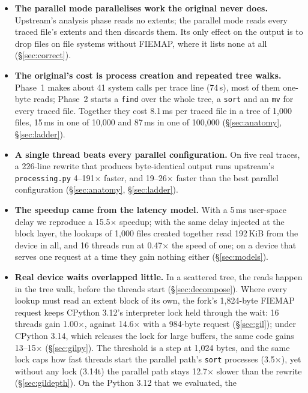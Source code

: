 \begin{itemize}
\item \textbf{The parallel mode parallelises work the original never does.} Upstream's
  analysis phase reads no extents; the parallel mode reads every traced file's
  extents and then discards them. Its only effect on the output is to drop files on
  file systems without FIEMAP, where it lists none at all (\S\ref{sec:correct}).
\item \textbf{The original's cost is process creation and repeated tree walks.}
  Phase~1 makes about 41 system calls per trace line (74\,\textmu s), most of them
  one-byte reads; Phase~2 starts a \texttt{find} over the whole tree, a \texttt{sort}
  and an \texttt{mv} for every traced file. Together they cost 8.1\,ms per traced file
  in a tree of 1{,}000 files, 15\,ms in one of 10{,}000 and 87\,ms in one of 100{,}000
  (\S\ref{sec:anatomy}, \S\ref{sec:ladder}).
\item \textbf{A single thread beats every parallel configuration.} On five real traces,
  a 226-line rewrite that produces byte-identical output runs upstream's
  \texttt{processing.py} 4--191$\times$ faster, and 19--26$\times$ faster than the best
  parallel configuration (\S\ref{sec:anatomy}, \S\ref{sec:ladder}).
\item \textbf{The speedup came from the latency model.} With a 5\,ms user-space delay
  we reproduce a 15.5$\times$ speedup; with the same delay injected at the block
  layer, the lookups of 1{,}000 files created together read 192\,KiB from the device
  in all, and 16 threads run at 0.47$\times$ the speed of one; on a device that serves
  one request at a time they gain nothing either (\S\ref{sec:models}).
\item \textbf{Real device waits overlapped little.} In a scattered tree, the reads
  happen in the tree walk, before the threads start (\S\ref{sec:decompose}). Where
  every lookup must read an extent block of its own, the fork's 1{,}824-byte FIEMAP
  request keeps CPython 3.12's interpreter lock held through the wait: 16 threads gain
  1.00$\times$, against 14.6$\times$ with a 984-byte request (\S\ref{sec:gil}); under
  CPython 3.14, which releases the lock for large buffers, the same code gains
  13--15$\times$ (\S\ref{sec:gilpy}). The threshold is a step at 1{,}024 bytes, and the
  same lock caps how fast threads start the parallel path's \texttt{sort} processes
  (3.5$\times$), yet without any lock (3.14t) the parallel path stays 12.7$\times$ slower
  than the rewrite (\S\ref{sec:gildepth}). On the Python 3.12 that we evaluated, the

\end{itemize}
